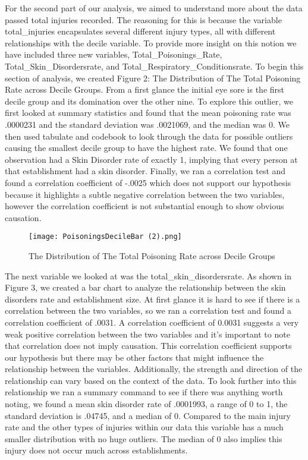 \documentclass[12pt]{article}
\begin{document}
For the second part of our analysis, we aimed to understand more about the data passed total injuries recorded. The reasoning for this is because the variable total\_injuries encapsulates several different injury types, all with different relationships with the decile variable. To provide more insight on this notion we have included three new variables, Total\_Poisonings\_Rate,  Total\_Skin\_Disordersrate, and Total\_Respiratory\_Conditionsrate. To begin this section of analysis, we created Figure 2: The Distribution of The Total Poisoning Rate across Decile Groups. From a first glance the initial eye sore is the first decile group and its domination over the other nine. To explore this outlier, we first looked at summary statistics and found that the mean poisoning rate was .0000231 and the standard deviation was .0021069, and the median was 0. We then used tabulate and codebook to look through the data for possible outliers causing the smallest decile group to have the highest rate. We found that one observation had a Skin Disorder rate of exactly 1, implying that every person at that establishment had a skin disorder. Finally, we ran a correlation test and found a correlation coefficient of -.0025 which does not support our hypothesis because it highlights a subtle negative correlation between the two variables, however the correlation coefficient is not substantial enough to show obvious causation.  

\begin{figure}
    \centering
    \texttt{[image: PoisoningsDecileBar (2).png]}
    \caption{The Distribution of The Total Poisoning Rate across Decile Groups}
    \label{Figure 2:}
\end{figure}


The next variable we looked at was the total\_skin\_disordersrate. As shown in Figure 3, we created a bar chart to analyze the relationship between the skin disorders rate and establishment size. At first glance it is hard to see if there is a correlation between the two variables, so we ran a correlation test and found a correlation coefficient of .0031. A correlation coefficient of 0.0031 suggests a very weak positive correlation between the two variables and it's important to note that correlation does not imply causation. This correlation coefficient supports our hypothesis but there may be other factors that might influence the relationship between the variables. Additionally, the strength and direction of the relationship can vary based on the context of the data. To look further into this relationship we ran a summary command to see if there was anything worth noting, we found a mean skin disorder rate of .0001993, a range of 0 to 1, the standard deviation is .04745, and a median of 0. Compared to the main injury rate and the other types of injuries within our data this variable has a much smaller distribution with no huge outliers. The median of 0 also implies this injury does not occur much across establishments. 
\end{document}
